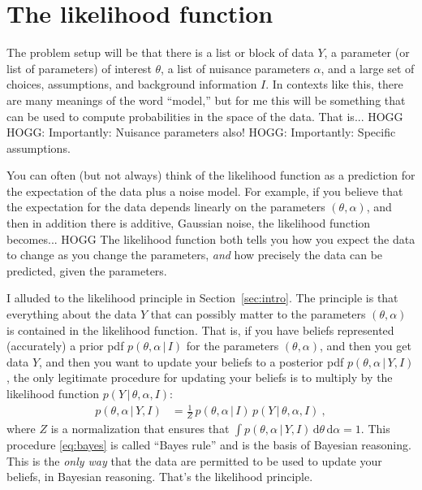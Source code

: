 \documentclass{article}
\newcommand{\sectionname}{Section}
\newcommand{\secref}[1]{\sectionname~\ref{#1}}
\newcommand{\dd}{\mathrm{d}}
\newcommand{\given}{\,|\,}
\begin{document}
\section{The likelihood function}\label{sec:lf}
The problem setup will be that there is a list or block of data $Y$, a parameter (or list of parameters) of interest $\theta$, a list of nuisance parameters $\alpha$, and a large set of choices, assumptions, and background information $I$.
In contexts like this, there are many meanings of the word ``model,'' but for me this will be something that can be used to compute probabilities in the space of the data.
That is... HOGG
HOGG: Importantly: Nuisance parameters also!
HOGG: Importantly: Specific assumptions.

You can often (but not always) think of the likelihood function as a prediction for the expectation of the data plus a noise model.
For example, if you believe that the expectation for the data depends linearly on the parameters $(\theta, \alpha)$, and then in addition there is additive, Gaussian noise, the likelihood function becomes... HOGG
The likelihood function both tells you how you expect the data to change as you change the parameters, \emph{and} how precisely the data can be predicted, given the parameters.

I alluded to the likelihood principle in \secref{sec:intro}.
The principle is that everything about the data $Y$ that can possibly matter to the parameters $(\theta,\alpha)$ is contained in the likelihood function.
That is, if you have beliefs represented (accurately) a prior pdf $p(\theta,\alpha\given I)$ for the parameters $(\theta,\alpha)$,
and then you get data $Y$,
and then you want to update your beliefs to a posterior pdf $p(\theta,\alpha\given Y,I)$, the only legitimate procedure for updating your beliefs is to multiply by the likelihood function $p(Y\given\theta,\alpha,I)$:
\begin{align}
    p(\theta,\alpha\given Y,I) &= \frac{1}{Z}\,p(\theta,\alpha\given I)\,p(Y\given\theta,\alpha,I) ~,\label{eq:bayes}
\end{align}
where $Z$ is a normalization that ensures that $\int p(\theta,\alpha\given Y,I)\,\dd\theta\,\dd\alpha=1$.
This procedure \eqref{eq:bayes} is called ``Bayes rule'' and is the basis of Bayesian reasoning.
This is the \emph{only way} that the data are permitted to be used to update your beliefs, in Bayesian reasoning.
That's the likelihood principle.
\end{document}
